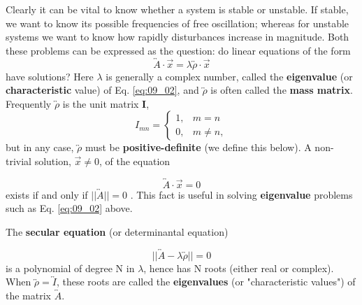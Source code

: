 Clearly it can be vital to know whether a system is stable or
unstable. If stable, we want to know its possible frequencies of
free oscillation; whereas for unstable systems we want to know
how rapidly disturbances increase in magnitude. Both these
problems can be expressed as the question: do linear equations
of the form
\begin{equation}
    \overleftrightarrow{A} \cdot \vec{x} = \lambda \overleftrightarrow{\rho} \cdot \vec{x} \label{eq:09_02}
\end{equation}
have solutions? Here $\lambda$ is generally a complex number, called the
\textbf{eigenvalue} (or \textbf{characteristic} value) of Eq. \ref{eq:09_02}, and $\overleftrightarrow{\rho}$ is often called
the \textbf{mass matrix}. Frequently $\overleftrightarrow{\rho}$ is the unit matrix \textbf{I},
\begin{equation}
I_{mn}=
\begin{cases}
     1, & m = n\\
     0, & m \neq n,
    \end{cases}
    \label{eq:09_03}
\end{equation}
but in any case, $\overleftrightarrow{\rho}$ must be \textbf{positive-definite} (we define this
below). A non-trivial solution, $\vec{x} \neq 0$, of the equation

\begin{equation}
    \label{eq:09_04}
    \overleftrightarrow{A} \cdot \vec{x} = 0
\end{equation}
exists if and only if $||\overleftrightarrow{A}||=0$ . This fact is useful in solving \textbf{eigenvalue} problems such as Eq. \ref{eq:09_02} above.


The \textbf{secular equation} (or determinantal equation)

\begin{equation}
    \label{eq:09_05}
    || \overleftrightarrow{A} - \lambda \overleftrightarrow{\rho} || = 0
\end{equation}
is a polynomial of degree N in $\lambda$, hence has N roots (either real or
complex). When $\overleftrightarrow{\rho}=\overleftrightarrow{I}$, these roots are called the \textbf{eigenvalues}
(or "characteristic values") of the matrix $\overleftrightarrow{A}$.

